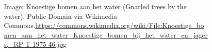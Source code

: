 \documentclass{article}
\begin{document}
\begin{figure}[h]
\begin{adjustbox}{minipage=[c]{\textwidth-10mm},margin= 5mm 5mm 5mm 10mm, frame=1pt, bgcolor=almond,env=center}
\begin{center}
\begin{minipage}[t]{0.7\paperwidth}
\end{minipage}
\end{center}
\caption*{Image: Knoestige bomen aan het water (Gnarled trees by the water). Public Domain via Wikimedia Commons.\newline \url{https://commons.wikimedia.org/wiki/File:Knoestige_bomen_aan_het_water_Knoestige_bomen_bij_het_water_en_jagers,_RP-T-1975-46.jpg}}
\end{adjustbox}
\end{figure}
\end{document}
